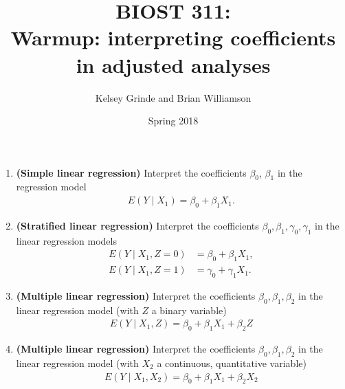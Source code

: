 \documentclass{article}
\begin{document}
\title{BIOST 311: \\ Warmup: interpreting coefficients in adjusted analyses}
\author{Kelsey Grinde and Brian Williamson}
\date{Spring 2018}

\maketitle

\begin{enumerate}
\item \textbf{(Simple linear regression)} Interpret the coefficients $\beta_0$, $\beta_1$ in the regression model 
\begin{align*}
E(Y \mid X_1) = \beta_0 + \beta_1 X_1.
\end{align*}

\item \textbf{(Stratified linear regression)} Interpret the coefficients $\beta_0, \beta_1, \gamma_0, \gamma_1$ in the linear regression models
\begin{align*}
E(Y \mid X_1, Z = 0) &= \beta_0 + \beta_1 X_1, \\
E(Y \mid X_1, Z = 1) &= \gamma_0 + \gamma_1 X_1.
\end{align*}

\item \textbf{(Multiple linear regression)} Interpret the coefficients $\beta_0, \beta_1, \beta_2$ in the linear regression model (with $Z$ a binary variable)
\begin{align*}
E(Y \mid X_1, Z) = \beta_0 + \beta_1 X_1 + \beta_2 Z
\end{align*}

\item \textbf{(Multiple linear regression)} Interpret the coefficients $\beta_0, \beta_1, \beta_2$ in the linear regression model (with $X_2$ a continuous, quantitative variable)
\begin{align*}
E(Y \mid X_1, X_2) = \beta_0 + \beta_1 X_1 + \beta_2 X_2
\end{align*}
\end{enumerate}
\end{document}
